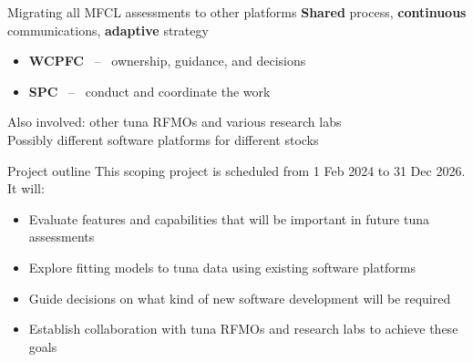 \documentclass[aspectratio=169,fleqn]{beamer}
\begin{document}

\begin{frame}{Migrating all MFCL assessments to other platforms}
  \textbf{\darkgreen Shared} process, {\darkgreen\bf continuous} communications,
  {\darkgreen\bf adaptive} strategy\\[3ex]
  \begin{itemize}
    \item[] {\blue\bf WCPFC} ~--~ ownership, guidance, and decisions\\[2ex]
    \item[] {\blue\bf SPC} ~--~ conduct and coordinate the work\\[4ex]
  \end{itemize}
  Also involved: other tuna RFMOs and various research labs\\[4ex]
  Possibly different software platforms for different stocks\\[4ex]
\end{frame}


\begin{frame}{Project outline}
  This scoping project is scheduled from 1 Feb 2024 to 31 Dec 2026. It
  will:\\[3ex]
  \begin{itemize}
    \item[] Evaluate features and capabilities that will be important in future
    tuna assessments\\[3ex]
    \item[] Explore fitting models to tuna data using existing software
    platforms\\[3ex]
    \item[] Guide decisions on what kind of new software development will be
    required\\[3ex]
    \item[] Establish collaboration with tuna RFMOs and research labs to achieve
    these goals\\[3ex]
  \end{itemize}
\end{frame}

\end{document}
